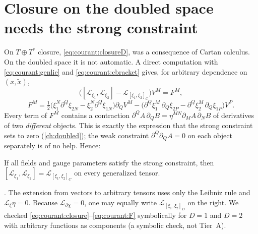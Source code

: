 \section{Closure on the doubled space needs the strong constraint}\label{sec:courant:closure}

On $T\oplus T^*$ closure, \eqref{eq:courant:closureD}, was a consequence of Cartan calculus. On the
doubled space it is not automatic. A direct computation with
\eqref{eq:courant:genlie} and \eqref{eq:courant:cbracket} gives, for arbitrary dependence on
$(x,\tilde x)$,
\begin{equation}\label{eq:courant:closure}
\bigl([\mathcal L_{\xi_1},\mathcal L_{\xi_2}]-\mathcal L_{[\xi_1,\xi_2]_C}\bigr)V^M=F^M,
\end{equation}
\begin{equation}\label{eq:courant:F}
F^M=\tfrac12\bigl(\xi_1^N\partial^Q\xi_{2N}-\xi_2^N\partial^Q\xi_{1N}\bigr)\partial_QV^M
-\bigl(\partial^Q\xi_1^M\,\partial_Q\xi_{2P}-\partial^Q\xi_2^M\,\partial_Q\xi_{1P}\bigr)V^P .
\end{equation}
Every term of $F^M$ contains a contraction $\partial^QA\,\partial_QB=\eta^{MN}\partial_MA\,
\partial_NB$ of derivatives of two \emph{different} objects. This is exactly the expression that
the strong constraint sets to zero (\cref{ch:doubled}); the weak constraint
$\partial^Q\partial_QA=0$ on each object separately is of no help. Hence:

\begin{proposition}[Closure]\label{prop:courant:closure}
If all fields and gauge parameters satisfy the strong constraint, then
$[\mathcal L_{\xi_1},\mathcal L_{\xi_2}]=\mathcal L_{[\xi_1,\xi_2]_C}$ on every generalized tensor.
\TL
\end{proposition}
\noindent{}. The extension from vectors to arbitrary tensors uses only the Leibniz rule and
$\mathcal L_\xi\eta=0$. Because $\mathcal L_{\partial\chi}=0$, one may equally write
$\mathcal L_{[\xi_1,\xi_2]_D}$ on the right. We checked \eqref{eq:courant:closure}--\eqref{eq:courant:F}
symbolically for $D=1$ and $D=2$ with arbitrary functions as components (a symbolic check, not
Tier~A).

